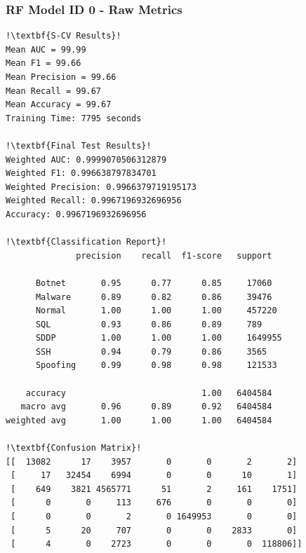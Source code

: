 \begin{appendices}
\subsubsection{RF Model ID 0 - Raw Metrics}
\begin{lstlisting}[escapechar=!]
!\textbf{S-CV Results}!
Mean AUC = 99.99
Mean F1 = 99.66
Mean Precision = 99.66
Mean Recall = 99.67
Mean Accuracy = 99.67
Training Time: 7795 seconds

!\textbf{Final Test Results}!
Weighted AUC: 0.9999070506312879
Weighted F1: 0.996638797834701
Weighted Precision: 0.9966379719195173
Weighted Recall: 0.9967196932696956
Accuracy: 0.9967196932696956

!\textbf{Classification Report}!
              precision    recall  f1-score   support

      Botnet       0.95      0.77      0.85     17060
      Malware      0.89      0.82      0.86     39476
      Normal       1.00      1.00      1.00     457220
      SQL          0.93      0.86      0.89     789
      SDDP         1.00      1.00      1.00     1649955
      SSH          0.94      0.79      0.86     3565
      Spoofing     0.99      0.98      0.98     121533

    accuracy                           1.00   6404584
   macro avg       0.96      0.89      0.92   6404584
weighted avg       1.00      1.00      1.00   6404584

!\textbf{Confusion Matrix}!
[[  13082      17    3957       0       0       2       2]
 [     17   32454    6994       0       0      10       1]
 [    649    3821 4565771      51       2     161    1751]
 [      0       0     113     676       0       0       0]
 [      0       0       2       0 1649953       0       0]
 [      5      20     707       0       0    2833       0]
 [      4       0    2723       0       0       0  118806]]
\end{lstlisting}


\end{appendices}
